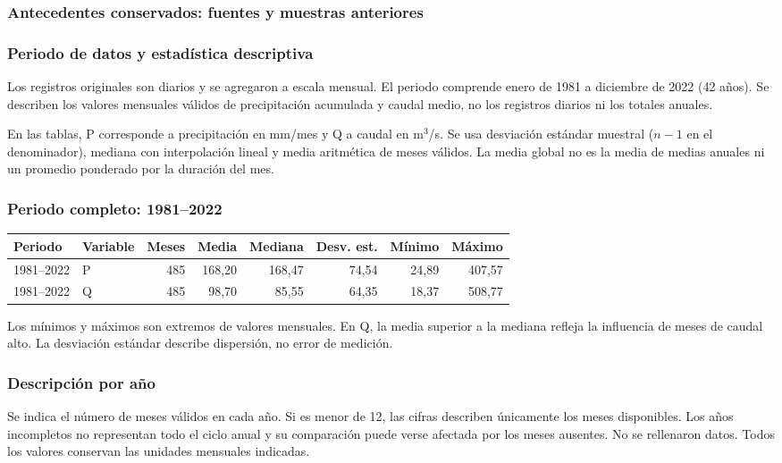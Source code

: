 \documentclass[10pt,a4paper]{article}
\begin{document}
\subsubsection*{Antecedentes conservados: fuentes y muestras anteriores}\subsubsection*{Periodo de datos y estadística descriptiva}
Los registros originales son diarios y se agregaron a escala mensual. El periodo
comprende enero de 1981 a diciembre de 2022 (42 años). Se describen los valores
mensuales válidos de precipitación acumulada y caudal medio, no los registros
diarios ni los totales anuales.

En las tablas, P corresponde a precipitación en mm/mes y Q a caudal en m$^3$/s.
Se usa desviación estándar muestral ($n-1$ en el denominador), mediana con
interpolación lineal y media aritmética de meses válidos. La media global no es
la media de medias anuales ni un promedio ponderado por la duración del mes.

\subsubsection*{Periodo completo: 1981--2022}
\begin{center}\small
\begin{center}
\begin{tabular}{llrrrrrr}\hline
Periodo & Variable & Meses & Media & Mediana & Desv. est. & Mínimo & Máximo \\
\hline
1981--2022 & P & 485 & 168,20 & 168,47 & 74,54 & 24,89 & 407,57 \\
1981--2022 & Q & 485 & 98,70 & 85,55 & 64,35 & 18,37 & 508,77 \\
\hline\end{tabular}
\end{center}\end{center}
Los mínimos y máximos son extremos de valores mensuales. En Q, la media superior
a la mediana refleja la influencia de meses de caudal alto. La desviación estándar
describe dispersión, no error de medición.

\subsubsection*{Descripción por año}
Se indica el número de meses válidos en cada año. Si es menor de 12, las cifras
describen únicamente los meses disponibles. Los años incompletos no representan
todo el ciclo anual y su comparación puede verse afectada por los meses ausentes.
No se rellenaron datos. Todos los valores conservan las unidades mensuales indicadas.
\end{document}
